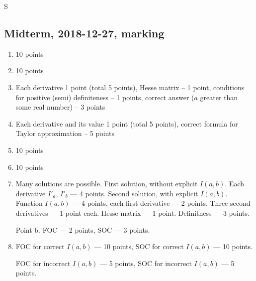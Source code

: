 S

\subsection{Midterm, 2018-12-27, marking}

\begin{enumerate}
  \item 10 points
  \item 10 points
  \item Each derivative 1 point (total 5 points), Hesse matrix – 1
  point, conditions for positive (semi) definiteness – 1 points, correct answer ($a$ greater than some real number) – 3 points
 \item  Each derivative and its value 1 point (total 5 points), correct formula for Taylor approximation – 5
points
  \item 10 points
  \item 10 points 
  \item Many solutions are possible. First solution, without explicit $I(a,b)$. Each derivative $I'_a$, $I'_b$ — 4 points. Second solution, with explicit $I(a,b)$. Function $I(a,b)$ — 4 points, each first derivative — 2 points.
  Three second derivatives — 1 point each. Hesse matrix — 1 point. Definitness — 3 points.

  Point b. FOC — 2 points, SOC — 3 points.
  \item FOC for correct $I(a,b)$ — 10 points, SOC for correct $I(a,b)$ — 10 points.

FOC for incorrect $I(a,b)$ — 5 points, SOC for incorrect $I(a,b)$ — 5 points.

\end{enumerate}
